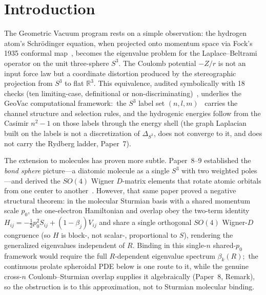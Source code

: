 \documentclass[aps,pra,twocolumn,superscriptaddress,longbibliography]{revtex4-2}
\begin{document}
\maketitle


\section{Introduction}
\label{sec:intro}

The Geometric Vacuum program rests on a simple observation: the
hydrogen atom's Schr\"odinger equation, when projected onto momentum
space via Fock's 1935 conformal map~\cite{Fock1935}, becomes the
eigenvalue problem for the Laplace--Beltrami operator on the unit
three-sphere $S^3$.  The Coulomb potential $-Z/r$ is not an input
force law but a coordinate distortion produced by the stereographic
projection from $S^3$ to flat $\mathbb{R}^3$.  This equivalence,
audited symbolically with 18 checks (ten limiting-case, definitional or non-discriminating)~\cite{loutey_paper7},
underlies the GeoVac computational framework:\ the $S^3$ label set
$(n,l,m)$~\cite{loutey_paper0, loutey_paper1} carries the channel
structure and selection rules, and the hydrogenic energies follow from
the Casimir $n^2 - 1$ on those labels through the energy shell (the
graph Laplacian built on the labels is not a discretization of
$\Delta_{S^3}$, does not converge to it, and does not carry the
Rydberg ladder, Paper~7).

The extension to molecules has proven more subtle.  Paper~8--9
established the \emph{bond sphere} picture---a diatomic molecule
as a single $S^3$ with two weighted poles---and derived the $SO(4)$
Wigner $D$-matrix elements that rotate atomic orbitals from one
center to another~\cite{loutey_paper8}.  However, that same paper
proved a negative structural theorem: in the molecular Sturmian basis
with a shared momentum scale $p_0$, the one-electron Hamiltonian and
overlap obey the two-term identity
$H_{ij} = -\tfrac12 p_0^2 S_{ij} + (1-\beta_j)V_{ij}$ and share a single
orthogonal $SO(4)$ Wigner-$D$ congruence (so $H$ is block-, not scalar-,
proportional to $S$), rendering the generalized eigenvalues independent
of $R$.  Binding in this
single-$n$ shared-$p_0$ framework would require the full $R$-dependent
eigenvalue spectrum $\beta_k(R)$;\ the continuous prolate spheroidal PDE below is
one route to it, while the genuine cross-$n$ Coulomb--Sturmian overlap supplies
it algebraically (Paper~8, Remark), so the obstruction is to this approximation,
not to Sturmian molecular binding.
\end{document}
